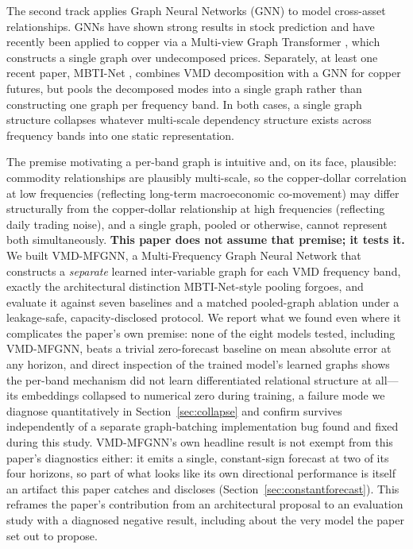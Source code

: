 \documentclass[journal]{IEEEtran}
\begin{document}
The second track applies Graph Neural Networks (GNN) to model cross-asset relationships. GNNs have shown strong results in stock prediction \citep{Cheng2022, Qian2024} and have recently been applied to copper via a Multi-view Graph Transformer \citep{Sun2025}, which constructs a single graph over undecomposed prices. Separately, at least one recent paper, MBTI-Net \citep{LiLiu2026}, combines VMD decomposition with a GNN for copper futures, but pools the decomposed modes into a single graph rather than constructing one graph per frequency band. In both cases, a single graph structure collapses whatever multi-scale dependency structure exists across frequency bands into one static representation.

The premise motivating a per-band graph is intuitive and, on its face, plausible: commodity relationships are plausibly multi-scale, so the copper-dollar correlation at low frequencies (reflecting long-term macroeconomic co-movement) may differ structurally from the copper-dollar relationship at high frequencies (reflecting daily trading noise), and a single graph, pooled or otherwise, cannot represent both simultaneously. \textbf{This paper does not assume that premise; it tests it.} We built VMD-MFGNN, a Multi-Frequency Graph Neural Network that constructs a \emph{separate} learned inter-variable graph for each VMD frequency band, exactly the architectural distinction MBTI-Net-style pooling forgoes, and evaluate it against seven baselines and a matched pooled-graph ablation under a leakage-safe, capacity-disclosed protocol. We report what we found even where it complicates the paper's own premise: none of the eight models tested, including VMD-MFGNN, beats a trivial zero-forecast baseline on mean absolute error at any horizon, and direct inspection of the trained model's learned graphs shows the per-band mechanism did not learn differentiated relational structure at all---its embeddings collapsed to numerical zero during training, a failure mode we diagnose quantitatively in Section~\ref{sec:collapse} and confirm survives independently of a separate graph-batching implementation bug found and fixed during this study. VMD-MFGNN's own headline result is not exempt from this paper's diagnostics either: it emits a single, constant-sign forecast at two of its four horizons, so part of what looks like its own directional performance is itself an artifact this paper catches and discloses (Section~\ref{sec:constantforecast}). This reframes the paper's contribution from an architectural proposal to an evaluation study with a diagnosed negative result, including about the very model the paper set out to propose.
\end{document}
